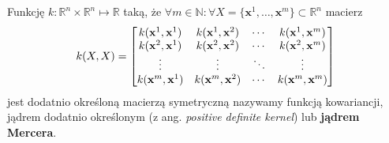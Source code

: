 \documentclass{myclass}
\numberwithin{equation}{section}
\begin{document}
\begin{definition}
Funkcję \(k: \mathbb{R}^n\times\mathbb{R}^n\mapsto\mathbb{R}\) taką, że \(\forall m\in\mathbb{N} :
\forall X = \{\mathbf{x}^1,\ldots,\mathbf{x}^m\} \subset \mathbb{R}^n\) macierz
\begin{equation*}
    k(X,X) = \mqty[k(\mathbf{x}^1, \mathbf{x}^1) & k(\mathbf{x}^1, \mathbf{x}^2) & \cdots & k(\mathbf{x}^1, \mathbf{x}^m)\\
    k(\mathbf{x}^2, \mathbf{x}^1) & k(\mathbf{x}^2, \mathbf{x}^2) & \cdots & k(\mathbf{x}^2, \mathbf{x}^m)\\
    \vdots & \vdots & \ddots & \vdots\\
    k(\mathbf{x}^m, \mathbf{x}^1) & k(\mathbf{x}^m, \mathbf{x}^2) & \cdots & k(\mathbf{x}^m, \mathbf{x}^m)\\]
\end{equation*}
jest dodatnio określoną macierzą symetryczną nazywamy funkcją kowariancji, jądrem dodatnio
określonym (z ang. \textit{positive definite kernel}) lub \textbf{jądrem Mercera}.
\end{definition}
\end{document}
